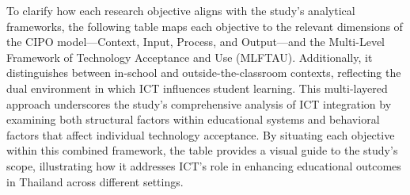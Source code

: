 \documentclass[
]{article}
\begin{document}
To clarify how each research objective aligns with the study's
analytical frameworks, the following table maps each objective to the
relevant dimensions of the CIPO model---Context, Input, Process, and
Output---and the Multi-Level Framework of Technology Acceptance and Use
(MLFTAU). Additionally, it distinguishes between in-school and
outside-the-classroom contexts, reflecting the dual environment in which
ICT influences student learning. This multi-layered approach underscores
the study's comprehensive analysis of ICT integration by examining both
structural factors within educational systems and behavioral factors
that affect individual technology acceptance. By situating each
objective within this combined framework, the table provides a visual
guide to the study's scope, illustrating how it addresses ICT's role in
enhancing educational outcomes in Thailand across different settings.
\end{document}
